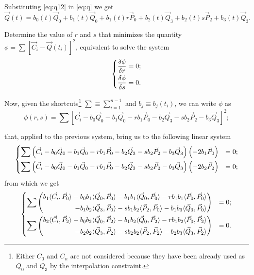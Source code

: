 \documentclass{scrartcl}
\newcommand\V[1]{\vec{#1}}
\newcommand\SP[2]{\langle #1, #2 \rangle}
\begin{document}
Substituting \eqref{eq:q12} in \eqref{eq:q} we get
\begin{equation*}
\V{Q}(t) = b_0(t) \V{Q}_0 + b_1(t) \V{Q}_0 + b_1(t) r \V{P}_0 +
b_2(t) \V{Q}_3 + b_2(t) s \V{P}_2 + b_3(t) \V{Q}_3.
\end{equation*}

Determine the value of $r$ and $s$ that minimizes the quantity
$\phi = \sum \left[ \V{C}_i - \V{Q}(t_i) \right]^2$, equivalent to
solve the system
\begin{equation*}
\begin{dcases}
\frac{\delta\phi}{\delta r} = 0;\\
\frac{\delta\phi}{\delta s} = 0.
\end{dcases}
\end{equation*}

Now, given the shortcuts\footnote{Either $C_0$ and $C_n$ are not
considered because they have been already used as $Q_0$ and $Q_3$ by the
interpolation constraint.} $\sum \equiv \sum_{i=1}^{n-1}$ and
$b_j \equiv b_j(t_i)$, we can write $\phi$ as
\begin{equation*}
    \phi(r, s) = \sum \left[ \V{C}_i - b_0 \V{Q}_0 - b_1 \V{Q}_0 -
    r b_1 \V{P}_0 - b_2 \V{Q}_3 - s b_2 \V{P}_2 - b_3 \V{Q}_3 \right]^2;
\end{equation*}

that, applied to the previous system, bring us to the following linear system
\begin{equation*}
\begin{dcases}
    \sum \left(
	\V{C}_i - b_0 \V{Q}_0 - b_1 \V{Q}_0 - r b_1 \V{P}_0 -
	b_2 \V{Q}_3 - s b_2 \V{P}_2 - b_3 \V{Q}_3
    \right) \left( -2 b_1 \V{P}_0 \right) &= 0; \\
    \sum \left(
	\V{C}_i - b_0 \V{Q}_0 - b_1 \V{Q}_0 - r b_1 \V{P}_0 -
	b_2 \V{Q}_3 - s b_2 \V{P}_2 - b_3 \V{Q}_3
    \right) \left( -2 b_2 \V{P}_2 \right) &= 0; \\
\end{dcases}
\end{equation*}
from which we get
\begin{equation*}
\begin{dcases}
    \sum \left(
    \begin{split}
	b_1       \SP{\V{C}_i}{\V{P}_0} -
	b_0 b_1   \SP{\V{Q}_0}{\V{P}_0} -
	b_1 b_1   \SP{\V{Q}_0}{\V{P}_0} -
	r b_1 b_1 \SP{\V{P}_0}{\V{P}_0} \\ -
	b_1 b_2   \SP{\V{Q}_3}{\V{P}_0} -
	s b_1 b_2 \SP{\V{P}_2}{\V{P}_0} -
	b_1 b_3   \SP{\V{Q}_3}{\V{P}_0}
    \end{split}
    \right) &= 0; \\
    \sum \left(
    \begin{split}
	b_2       \SP{\V{C}_i}{\V{P}_2} -
	b_0 b_2   \SP{\V{Q}_0}{\V{P}_2} -
	b_1 b_2   \SP{\V{Q}_0}{\V{P}_2} -
	r b_1 b_2 \SP{\V{P}_0}{\V{P}_2} \\ -
	b_2 b_2   \SP{\V{Q}_3}{\V{P}_2} -
	s b_2 b_2 \SP{\V{P}_2}{\V{P}_2} -
	b_2 b_3   \SP{\V{Q}_3}{\V{P}_2}
    \end{split}
    \right) &= 0. \\
\end{dcases}
\end{equation*}
\end{document}
